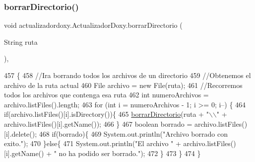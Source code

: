 \subsubsection{\texorpdfstring{borrar\+Directorio()}{borrarDirectorio()}}
{\footnotesize\ttfamily void actualizadordoxy.\+Actualizador\+Doxy.\+borrar\+Directorio (\begin{DoxyParamCaption}\item[{String}]{ruta }\end{DoxyParamCaption})\hspace{0.3cm}{\ttfamily [inline]}, {\ttfamily [private]}}


\begin{DoxyCode}
457                                               \{
458         \textcolor{comment}{//Ira borrando todos los archivos de un directorio}
459         \textcolor{comment}{//Obtenemos el archivo de la ruta actual}
460         File archivo = \textcolor{keyword}{new} File(ruta);
461         \textcolor{comment}{//Recorremos todos los archivos que contenga esa ruta}
462         \textcolor{keywordtype}{int} numeroArchivos = archivo.listFiles().length;
463         \textcolor{keywordflow}{for} (\textcolor{keywordtype}{int} i = numeroArchivos - 1; i >= 0; i--) \{
464             \textcolor{keywordflow}{if}(archivo.listFiles()[i].isDirectory())\{
465                 \mbox{\hyperlink{classactualizadordoxy_1_1_actualizador_doxy_a19ee42edb9fe87c54d8581bc1a37ed77}{borrarDirectorio}}(ruta + \textcolor{stringliteral}{"\(\backslash\)\(\backslash\)"} + archivo.listFiles()[i].getName());
466             \}
467             \textcolor{keywordtype}{boolean} borrado = archivo.listFiles()[i].delete();
468             \textcolor{keywordflow}{if}(borrado)\{
469                 System.out.println(\textcolor{stringliteral}{"Archivo borrado con exito."});
470             \}\textcolor{keywordflow}{else}\{
471                 System.out.println(\textcolor{stringliteral}{"El archivo "} + archivo.listFiles()[i].getName() + \textcolor{stringliteral}{" no ha podido ser
       borrado."});
472             \}
473         \}
474     \}
\end{DoxyCode}
\mbox{\label{classactualizadordoxy_1_1_actualizador_doxy_a552da974148de3397521e9ca911e5568}} 
